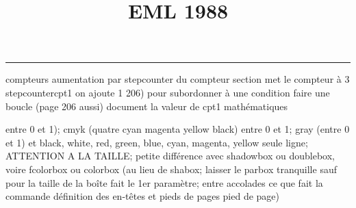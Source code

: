 \documentclass[11pt]{article}%
\title{\bf \vspace{-2cm} EML 1988} %
\author{} %
\date{} %
\renewcommand{\headrulewidth}{0pt}%
\renewcommand{\footrulewidth}{0.4pt}%
\begin{document}
\maketitle %
\vspace{-1.4cm}\hrule %
\thispagestyle{fancy}

\vspace*{.2cm}



compteurs%
aumentation par stepcounter du compteur section%
met le compteur à 3%
stepcounter{cpt1} on ajoute 1%
206) pour subordonner à une condition %
faire une boucle (page 206 aussi) %
document la valeur de cpt1 
mathématiques\newcommand{\ch}{\operatorname{ch}} 
\newcommand{\sh}{\operatorname{sh}}
\renewcommand{\tanh}{\operatorname{th}}
\renewcommand{\sinh}{\operatorname{sh}}
\renewcommand{\cosh}{\operatorname{ch}}
\newcommand{\argsh}{\operatorname{argsh}}
\newcommand{\argch}{\operatorname{argch}}
\newcommand{\argth}{\operatorname{argth}}
\newcommand{\ker}{\operatorname{Ker}}
\renewcommand{\im}{\operatorname{Im}}
\newcommand{\rg}{\operatorname{rg}}
\newcommand{\Id}{\operatorname{Id}}
\newcommand{\id}{\operatorname{id}}
\renewcommand{\leq}{\leq}
\renewcommand{\geq}{\geq }

entre 0 et 1); cmyk (quatre cyan magenta yellow black) entre 0 et 1;
gray (entre 0 et 1) et black, white, red, green, blue, cyan, magenta,
yellow%
seule ligne; ATTENTION A LA TAILLE; petite différence avec shadowbox ou
doublebox, voire fcolorbox ou colorbox (au lieu de shabox; laisser le
parbox tranquille sauf pour la taille de la boîte
\newcommand{\Tbox}[1]{\begin{center} \shabox{\parbox{0.6
\linewidth}{#1}} \end{center}} %
fait le 1er paramètre; entre accolades ce que fait la commande
définition des en-têtes et pieds de pages\pagestyle{fancy}
\chead{}
\rfoot[ \ \thepage]{\thepage}
\cfoot{}
\lfoot{}
\thispagestyle{fancy} %
pied de page)\renewcommand{\footrulewidth}{0.4pt}
\renewcommand{\headrulewidth}{0.4pt}
\end{document}
